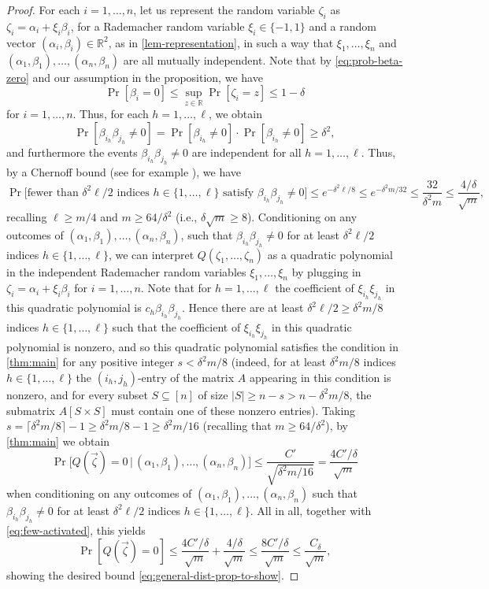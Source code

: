 \documentclass[english]{article}
\theoremstyle{remark}
\numberwithin{equation}{section}
\numberwithin{figure}{section}
\newcommand{\su}{\subseteq}
\newcommand{\RR}{\mathbb{R}}
\begin{document}
\begin{proof}
    For each $i=1,\dots,n$, let us represent the random variable $\zeta_i$ as $\zeta_i=\alpha_i+\xi_i \beta_i$, for a Rademacher random variable $\xi_i\in\{-1,1\}$ and a random vector $(\alpha_i,\beta_i)\in \RR^2$, as in \cref{lem-representation}, in such a way that $\xi_1,\dots,\xi_n$ and $(\alpha_1,\beta_1),\dots,(\alpha_n,\beta_n)$ are all mutually independent. Note that by \cref{eq:prob-beta-zero} and our assumption in the proposition, we have
    \[\Pr[\beta_i=0] \le \sup_{z\in \RR}\Pr[\zeta_i=z]\le 1-\delta\]
    for $i=1,\dots,n$. Thus, for each $h=1,\dots,\ell$, we obtain
    \[\Pr[\beta_{i_h}\beta_{j_h}\ne 0] =\Pr[\beta_{i_h}\ne 0]\cdot \Pr[\beta_{i_h}\ne 0]\ge \delta^2,\]
    and furthermore the events $\beta_{i_h}\beta_{j_h}\ne 0$ are independent for all $h=1,\dots,\ell$. Thus, by a Chernoff bound (see for example \cite[Theorem~2.1]{JLR}), we have
    \begin{equation}\label{eq:few-activated}
        \Pr\bigl[\text{fewer than }\delta^2\ell/2\text{ indices }h\in \{1,\dots,\ell\}\text{ satisfy }\beta_{i_h}\beta_{j_h}\ne 0\bigr]\le e^{-\delta^2\ell/8}\le e^{-\delta^2m/32}\le\frac{32}{\delta^2m}\le\frac{4/\delta}{\sqrt{m}},
    \end{equation}
    recalling $\ell\ge m/4$ and $m\ge 64/\delta^2$ (i.e., $
    \delta \sqrt{m}\ge 8$). Conditioning on any outcomes of $(\alpha_1,\beta_1),\dots,(\alpha_n,\beta_n)$, such that $\beta_{i_h}\beta_{j_h}\ne 0$ for at least $\delta^2\ell/2$ indices $h\in \{1,\dots,\ell\}$, we can interpret $Q(\zeta_1,\dots,\zeta_n)$ as a quadratic polynomial in the independent Rademacher random variables $\xi_1,\dots,\xi_n$ by plugging in $\zeta_i=\alpha_i+\xi_i \beta_i$ for $i=1,\dots,n$. Note that for $h=1,\dots,\ell$ the coefficient of $\xi_{i_h}\xi_{j_h}$ in this quadratic polynomial is $c_h\beta_{i_h}\beta_{j_h}$. Hence there are at least $\delta^2\ell/2\ge \delta^2m/8$ indices $h\in \{1,\dots,\ell\}$ such that the coefficient of $\xi_{i_h}\xi_{j_h}$ in this quadratic polynomial is nonzero, and so this quadratic polynomial satisfies the condition in \cref{thm:main} for any positive integer $s<\delta^2m/8$ (indeed, for at least $\delta^2m/8$ indices $h\in \{1,\dots,\ell\}$ the $(i_h,j_h)$-entry of the matrix $A$ appearing in this condition is nonzero, and for every subset $S\su [n]$ of size $|S|\ge n-s>n-\delta^2m/8$, the submatrix $A[S\times S]$ must contain one of these nonzero entries). Taking $s=\lceil\delta^2m/8\rceil-1\ge \delta^2m/8-1\ge \delta^2m/16$ (recalling that $m\ge 64/\delta^2$), by \cref{thm:main} we obtain
    \[\Pr\bigl[Q(\vec \zeta)=0\,\big|\,(\alpha_1,\beta_1),\dots,(\alpha_n,\beta_n)\bigr]\le \frac{C'}{\sqrt{\delta^2m/16}}=\frac{4C'/\delta}{\sqrt{m}}\]
    when conditioning on any outcomes of $(\alpha_1,\beta_1),\dots,(\alpha_n,\beta_n)$ such that $\beta_{i_h}\beta_{j_h}\ne 0$ for at least $\delta^2\ell/2$ indices $h\in \{1,\dots,\ell\}$. All in all, together with \cref{eq:few-activated}, this yields
     \[\Pr[Q(\vec \zeta)=0]\le \frac{4C'/\delta}{\sqrt{m}}+\frac{4/\delta}{\sqrt{m}}\le \frac{8C'/\delta}{\sqrt{m}}\le \frac{C_\delta}{\sqrt{m}},\]
     showing the desired bound \cref{eq:general-dist-prop-to-show}.


\end{proof}
\end{document}
